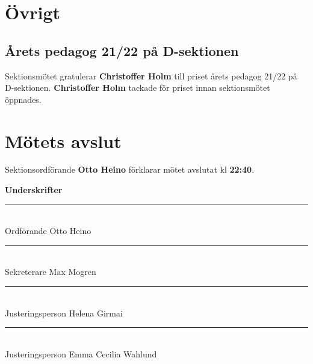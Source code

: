 \documentclass{datateknologsektionen-document}
\begin{document}
\section{Övrigt}
\subsection{Årets pedagog 21/22 på D-sektionen}
Sektionsmötet gratulerar \textbf{Christoffer Holm} till priset årets pedagog 21/22 på D-sektionen. \textbf{Christoffer Holm} tackade för priset innan sektionsmötet öppnades.


\section{Mötets avslut}
Sektionsordförande \textbf{Otto Heino} förklarar mötet avslutat kl \textbf{22:40}.




\pagebreak
{\Large\bfseries Underskrifter}

\vspace*{1.2cm}
\noindent\rule{8cm}{1pt}\\
Ordförande Otto Heino

\vspace*{1.2cm}
\noindent\rule{8cm}{1pt}\\
Sekreterare Max Mogren

\vspace*{1.2cm}
\noindent\rule{8cm}{1pt}\\
Justeringsperson  Helena Girmai

\vspace*{1.2cm}
\noindent\rule{8cm}{1pt}\\
Justeringsperson Emma Cecilia Wahlund
\end{document}
